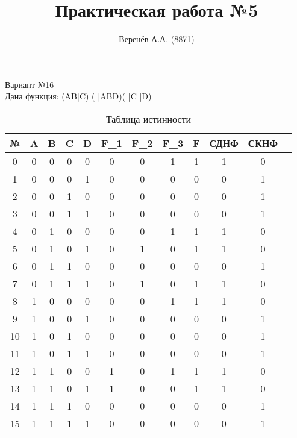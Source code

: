 \documentclass[a4paper,11pt]{article}
\title{Практическая работа №5}
\author{Веренёв А.А. (8871)}
\begin{document}
\maketitle
\begin{center}
\begin{flushleft}
Вариант №16 \\
Дана функция: (A\wedge B\wedge  \bar C) \vee ( \bar A\wedge  B\wedge D)\vee( \bar C \wedge \bar D)\\
\end{flushleft}
\begin{table}[h]
\centering
\begin{tabular}{|c|c|c|c|c|c|c|c|c|c|c|c|}
\hline
№ & A & B & C & D & F_1 & F_2 & F_3 & F & СДНФ & СКНФ  \\
\hline
0 & 0 & 0 & 0 & 0 & 0 & 0 & 1 & 1 & 1 & 0\\
1 & 0 & 0 & 0 & 1 & 0 & 0 & 0 & 0 & 0 & 1\\
2 & 0 & 0 & 1 & 0 & 0 & 0 & 0 & 0 & 0 & 1\\
3 & 0 & 0 & 1 & 1 & 0 & 0 & 0 & 0 & 0 & 1\\
4 & 0 & 1 & 0 & 0 & 0 & 0 & 1 & 1 & 1& 0\\
5 & 0 & 1 & 0 & 1 & 0 & 1 & 0 & 1 & 1 & 0\\
6 & 0 & 1 & 1 & 0 & 0 & 0 & 0 & 0 & 0 & 1\\
7 & 0 & 1 & 1 & 1 & 0 & 1 & 0 & 1 & 1 & 0\\
8 & 1 & 0 & 0 & 0 & 0 & 0 & 1 & 1 & 1 & 0\\
9 & 1 & 0 & 0 & 1 & 0 & 0 & 0 & 0 & 0 & 1\\
10 & 1 & 0 & 1 & 0 & 0 & 0 & 0 & 0 & 0 & 1\\
11 & 1 & 0 & 1 & 1 & 0 & 0 & 0 & 0 & 0 & 1\\
12 & 1 & 1 & 0 & 0 & 1 & 0 & 1 & 1 & 1 & 0\\
13 & 1 & 1 & 0 & 1 & 1 & 0 & 0 & 1 & 1 & 0\\
14 & 1 & 1 & 1 & 0 & 0 & 0 & 0 & 0 & 0 & 1\\
15 & 1 & 1 & 1 & 1 & 0 & 0 & 0 & 0 & 0 & 1\\
\hline
\end{tabular}
\caption{Таблица истинности}
\end{table}
\end{center}\\
\end{document}
